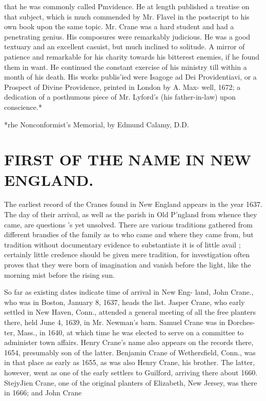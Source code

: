 \documentclass[oneside]{book}
\begin{document}
that he was commonly called Pmvidence. He at length published 
a treatise on that subject, which is much commended by Mr. 
Flavel in the postscript to his own book upon the same topic. 
Mr. Crane was a hard student and had a penetrating genius. 
His composures were remarkably judicious. He was a good 
textuary and an excellent casuist, but much inclined to solitude. 
A mirror of patience and remarkable for his charity towards his 
bitterest enemies, if he found them in want. He continued the 
constant exercise of his ministry till within a month of his death. 
His works publis'ied were Isagoge ad Dei Providentiavi, or a 
Prospect of Divine Providence, printed in London by A. Max- 
well, 1672; a dedication of a posthumous piece of Mr. Lyford's 
(his father-in-law) upon conscience.* 

*rhe Nonconformist's Memorial, by Edmund Calamy, D.D. 



\chapter{FIRST OF THE NAME IN NEW ENGLAND.}


The earliest record of the Cranes found in New England appears 
in the year 1637. The day of their arrival, as well as the parish 
in Old P'ngland from whence they came, are questions 's yet 
unsolved. There are various traditions gathered from different 
brandies of the family as to who came and where they came 
from, but tradition without documentary evidence to substantiate 
it is of little avail ; certainly little credence should be given mere 
tradition, for investigation often proves that they were born of 
imagination and vanish before the light, like the morning mist 
before the rising sun. 

So far as existing dates indicate time of arrival in New Eng- 
land, John Crane., who was in Boston, January 8, 1637, heads the 
list. Jasper Crane, who early settled in New Haven, Conn., 
attended a general meeting of all the free planters there, held June 
4, 1639, in Mr. Newman's barn. Samuel Crane was in Dorches- 
ter, Mass., in 1640, at which time he was elected to serve on a 
committee to administer town affairs. Henry Crane's name also 
appears on the records there, 1654, presumably son of the latter. 
Benjamin Crane of Wethersfield, Conn., was in that place as 
early as 1655, as was also Henry Crane, his brother. The latter, 
however, went as one of the early settlers to Guilford, arriving 
there about 1660. StejyJien Crane, one of the original planters 
of Elizabeth, New Jersey, was there in 1666; and John Crane 
\end{document}
